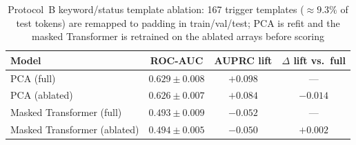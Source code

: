 \documentclass[a4paper]{llncs}
\renewcommand{\arraystretch}{0.95}
\begin{document}
\begin{table}[htbp]
\caption{Protocol~B keyword/status template ablation: 167 trigger templates ($\approx9.3\%$ of test tokens) are remapped to padding in train/val/test; PCA is refit and the masked Transformer is retrained on the ablated arrays before scoring}
\label{tab_ablation}
\centering
\setlength{\tabcolsep}{3pt}
\renewcommand{\arraystretch}{0.88}
\begin{tabular}{l c c c}
\toprule
\textbf{Model} & \textbf{ROC-AUC} & \textbf{AUPRC lift} & \textbf{$\Delta$ lift vs.\ full} \\
\midrule
PCA (full) & $0.629\pm0.008$ & $+0.098$ & --- \\
PCA (ablated) & $0.626\pm0.007$ & $+0.084$ & $-0.014$ \\
Masked Transformer (full) & $0.493\pm0.009$ & $-0.052$ & --- \\
Masked Transformer (ablated) & $0.494\pm0.005$ & $-0.050$ & $+0.002$ \\
\bottomrule
\end{tabular}
\end{table}

\begin{table}[htbp]
\caption{Protocol~B threshold comparison (mean over 5 seeds): fixed $\mu{+}3\sigma$ vs.\ \emph{test} metrics at a validation-selected F1 threshold $\tau_{\mathrm{val}}$ (diagnostic)}
\label{tab_thr}
\centering
\setlength{\tabcolsep}{2.5pt}
\renewcommand{\arraystretch}{0.88}
\end{table}
\end{document}
